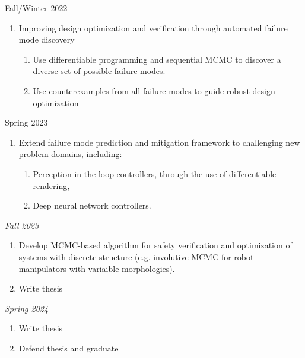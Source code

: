 Fall/Winter 2022
\begin{enumerate}
    \item Improving design optimization and verification through automated failure mode discovery
          \begin{enumerate}
              \item Use differentiable programming and sequential MCMC to discover a diverse set of possible failure modes.
              \item Use counterexamples from all failure modes to guide robust design optimization
          \end{enumerate}
\end{enumerate}

Spring 2023
\begin{enumerate}
    \item Extend failure mode prediction and mitigation framework to challenging new problem domains, including:
          \begin{enumerate}
              \item Perception-in-the-loop controllers, through the use of differentiable rendering,
              \item Deep neural network controllers.
          \end{enumerate}
\end{enumerate}

\textit{Fall 2023}
\begin{enumerate}
    \item Develop MCMC-based algorithm for safety verification and optimization of systems with discrete structure (e.g. involutive MCMC for robot manipulators with variaible morphologies).
    \item Write thesis
\end{enumerate}

\textit{Spring 2024}
\begin{enumerate}
    \item Write thesis
    \item Defend thesis and graduate
\end{enumerate}
